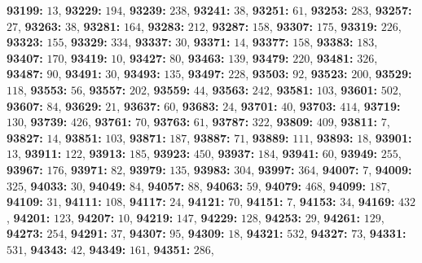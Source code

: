 \textsf{\bfseries 93199:} $13$, \textsf{\bfseries 93229:} $194$, \textsf{\bfseries 93239:} $238$, \textsf{\bfseries 93241:} $38$, \textsf{\bfseries 93251:} $61$, \textsf{\bfseries 93253:} $283$, \textsf{\bfseries 93257:} $27$, \textsf{\bfseries 93263:} $38$, \textsf{\bfseries 93281:} $164$, \textsf{\bfseries 93283:} $212$, \textsf{\bfseries 93287:} $158$, \textsf{\bfseries 93307:} $175$, \textsf{\bfseries 93319:} $226$, \textsf{\bfseries 93323:} $155$, \textsf{\bfseries 93329:} $334$, \textsf{\bfseries 93337:} $30$, \textsf{\bfseries 93371:} $14$, \textsf{\bfseries 93377:} $158$, \textsf{\bfseries 93383:} $183$, \textsf{\bfseries 93407:} $170$, \textsf{\bfseries 93419:} $10$, \textsf{\bfseries 93427:} $80$, \textsf{\bfseries 93463:} $139$, \textsf{\bfseries 93479:} $220$, \textsf{\bfseries 93481:} $326$, \textsf{\bfseries 93487:} $90$, \textsf{\bfseries 93491:} $30$, \textsf{\bfseries 93493:} $135$, \textsf{\bfseries 93497:} $228$, \textsf{\bfseries 93503:} $92$, \textsf{\bfseries 93523:} $200$, \textsf{\bfseries 93529:} $118$, \textsf{\bfseries 93553:} $56$, \textsf{\bfseries 93557:} $202$, \textsf{\bfseries 93559:} $44$, \textsf{\bfseries 93563:} $242$, \textsf{\bfseries 93581:} $103$, \textsf{\bfseries 93601:} $502$, \textsf{\bfseries 93607:} $84$, \textsf{\bfseries 93629:} $21$, \textsf{\bfseries 93637:} $60$, \textsf{\bfseries 93683:} $24$, \textsf{\bfseries 93701:} $40$, \textsf{\bfseries 93703:} $414$, \textsf{\bfseries 93719:} $130$, \textsf{\bfseries 93739:} $426$, \textsf{\bfseries 93761:} $70$, \textsf{\bfseries 93763:} $61$, \textsf{\bfseries 93787:} $322$, \textsf{\bfseries 93809:} $409$, \textsf{\bfseries 93811:} $7$, \textsf{\bfseries 93827:} $14$, \textsf{\bfseries 93851:} $103$, \textsf{\bfseries 93871:} $187$, \textsf{\bfseries 93887:} $71$, \textsf{\bfseries 93889:} $111$, \textsf{\bfseries 93893:} $18$, \textsf{\bfseries 93901:} $13$, \textsf{\bfseries 93911:} $122$, \textsf{\bfseries 93913:} $185$, \textsf{\bfseries 93923:} $450$, \textsf{\bfseries 93937:} $184$, \textsf{\bfseries 93941:} $60$, \textsf{\bfseries 93949:} $255$, \textsf{\bfseries 93967:} $176$, \textsf{\bfseries 93971:} $82$, \textsf{\bfseries 93979:} $135$, \textsf{\bfseries 93983:} $304$, \textsf{\bfseries 93997:} $364$, \textsf{\bfseries 94007:} $7$, \textsf{\bfseries 94009:} $325$, \textsf{\bfseries 94033:} $30$, \textsf{\bfseries 94049:} $84$, \textsf{\bfseries 94057:} $88$, \textsf{\bfseries 94063:} $59$, \textsf{\bfseries 94079:} $468$, \textsf{\bfseries 94099:} $187$, \textsf{\bfseries 94109:} $31$, \textsf{\bfseries 94111:} $108$, \textsf{\bfseries 94117:} $24$, \textsf{\bfseries 94121:} $70$, \textsf{\bfseries 94151:} $7$, \textsf{\bfseries 94153:} $34$, \textsf{\bfseries 94169:} $432$, \textsf{\bfseries 94201:} $123$, \textsf{\bfseries 94207:} $10$, \textsf{\bfseries 94219:} $147$, \textsf{\bfseries 94229:} $128$, \textsf{\bfseries 94253:} $29$, \textsf{\bfseries 94261:} $129$, \textsf{\bfseries 94273:} $254$, \textsf{\bfseries 94291:} $37$, \textsf{\bfseries 94307:} $95$, \textsf{\bfseries 94309:} $18$, \textsf{\bfseries 94321:} $532$, \textsf{\bfseries 94327:} $73$, \textsf{\bfseries 94331:} $531$, \textsf{\bfseries 94343:} $42$, \textsf{\bfseries 94349:} $161$, \textsf{\bfseries 94351:} $286$, 
